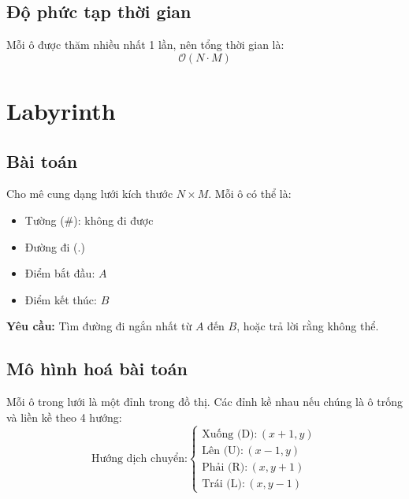 \documentclass{article}
\begin{document}
	\subsection*{Độ phức tạp thời gian}
	Mỗi ô được thăm nhiều nhất 1 lần, nên tổng thời gian là:
	\[
	\mathcal{O}(N \cdot M)
	\]

	\section{Labyrinth}
	\subsection*{Bài toán}
	Cho mê cung dạng lưới kích thước \( N \times M \). Mỗi ô có thể là:
	\begin{itemize}
		\item Tường (\#): không đi được
		\item Đường đi (.)
		\item Điểm bắt đầu: \( A \)
		\item Điểm kết thúc: \( B \)
	\end{itemize}
	
	\textbf{Yêu cầu:} Tìm đường đi ngắn nhất từ \( A \) đến \( B \), hoặc trả lời rằng không thể.
	
	\subsection*{Mô hình hoá bài toán}
	Mỗi ô trong lưới là một đỉnh trong đồ thị. Các đỉnh kề nhau nếu chúng là ô trống và liền kề theo 4 hướng:
	\[
	\text{Hướng dịch chuyển:}
	\begin{cases}
		\text{Xuống (D)}: (x+1, y) \\
		\text{Lên (U)}: (x-1, y) \\
		\text{Phải (R)}: (x, y+1) \\
		\text{Trái (L)}: (x, y-1)
	\end{cases}
	\]
	
\end{document}
